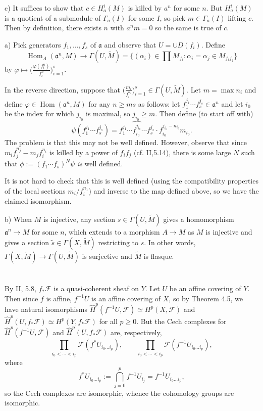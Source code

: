 \documentclass{report}
\newcommand{\F}{\mathcal{F}}
\DeclareMathOperator{\Hom}{Hom}
\begin{document}
\noindent
c)	It suffices to show that $c\in H_a^i(M)$ is killed by $a^n$ for some $n$.  But $H_a^i(M)$ is a quotient
of a submodule of $\Gamma_a(I)$ for some $I$, so pick $m\in\Gamma_a(I)$ lifting $c$.  Then by definition,
there exists $n$ with $a^n m=0$ so the same is true of $c$.  

\bigskip
{}	a) Pick generators $f_1,\ldots,f_s$ of $\mathfrak{a}$ and observe that $U=\cup D(f_i)$.
Define $$\Hom_A(\mathfrak{a}^n,M)\rightarrow \Gamma(U,\widetilde{M})=\{(\alpha_i)\in \prod M_{f_i}: \alpha_i=\alpha_j\in M_{f_if_j}\}$$
by $\varphi\mapsto \big(\frac{\varphi(f_i^n)}{f_i^n}\big)_{i=1}^s$.  

In the reverse direction, suppose that $\big(\frac{m_i}{f_i^{n_i}}\big)_{i=1}^s\in\Gamma(U,\widetilde{M})$.  Let $m=\max n_i$
and define $\varphi\in \Hom(\mathfrak{a}^{n},M)$ for any $n\ge ms$ as follows:
let $f_1^{j_1}\cdots f_s^{j_s}\in \mathfrak{a}^n$ and let $i_0$ be the index for which $j_{i_0}$ is maximal,
so $j_{i_0}\ge m$.  Then define (to start off with)
$$\psi(f_1^{j_1}\cdots f_s^{j_s})=f_1^{j_1}\cdots \widehat{f_{i_0}^{j_{i_0}}}\cdots f_s^{j_s} \cdot  f_{i_0}^{j_{i_0}-n_{i_0}} m_{i_0}.$$ 
The problem is that this may not be well defined.
However, observe that since $m_i f_j^{n_j}-m_j f_i^{n_i}$ is killed by a power of $f_if_j$ (cf. II,5.14), there is some large $N$ 
such that $\phi:=(f_1\cdots f_s)^N \psi$ {\em is} well defined.

It is not hard to check that this is well defined (using the compatibility properties of the local sections $m_i/f_i^{n_1}$)
and inverse to the map defined above, so we have the claimed isomorphism.

 
\noindent
b) When $M$ is injective, any section $s\in \Gamma(U,\widetilde{M})$ gives a homomorphism $\mathfrak{a}^n\rightarrow M$
for some $n$, which extends to a morphism $A\rightarrow M$ as $M$ is injective and gives a section $\widetilde{s}\in \Gamma(X,\widetilde{M})$
restricting to $s$.  In other words, $\Gamma(X,\widetilde{M})\rightarrow \Gamma(U,\widetilde{M})$ is surjective and $\widetilde{M}$
is flasque.

\section{}

\bigskip{}	By II, 5.8, $f_*\F$ is a quasi-coherent sheaf on $Y$.  Let $U$ be an affine covering of $Y$.  Then since
$f$ is affine, $f^{-1}U$ is an affine covering of $X$, so by Theorem 4.5, we have natural isomorphisms
$\widehat{H}^p(f^{-1}U,\F)\simeq H^p(X,\F)$ and  $\widehat{H}^p(U,f_*\F)\simeq H^p(Y,f_*\F)$ for all $p\ge 0$.
But the Cech complexes for $\widehat{H}^p(f^{-1}U,\F)$ and $\widehat{H}^p(U,f_* \F)$ are, respectively,
$$\prod_{i_0<\cdots<i_p} \F(f^*U_{i_0\ldots i_p}),\qquad\prod_{i_0<\cdots<i_p} \F(f^{-1}U_{i_0\ldots i_p}),$$
where
$$f^*U_{i_0\ldots i_p}:=\bigcap_{j=0}^p f^{-1}U_{i_j}=f^{-1}U_{i_0\ldots i_p},$$ so the Cech complexes are
isomorphic, whence the cohomology groups are isomorphic.
\end{document}
